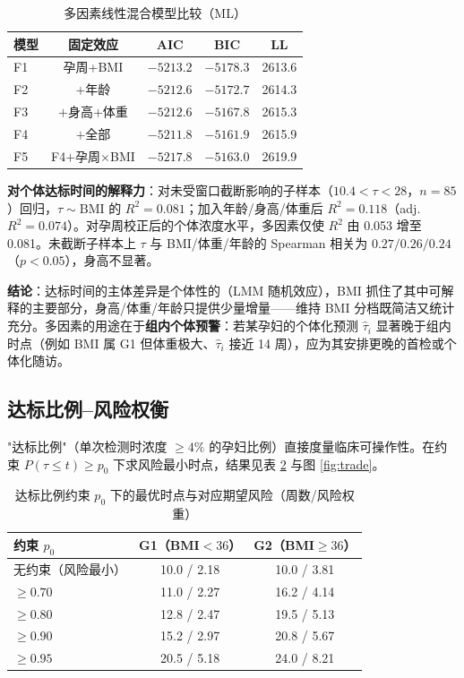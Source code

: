 \documentclass[11pt,a4paper]{ctexart}
\begin{document}
\begin{table}[H]
\centering\small
\caption{多因素线性混合模型比较（ML）}\label{tab:multi}
\begin{tabular}{lcccc}
\toprule
模型 & 固定效应 & AIC & BIC & LL\\
\midrule
F1 & 孕周+BMI & $\mathbf{-5213.2}$ & $\mathbf{-5178.3}$ & 2613.6\\
F2 & $+$年龄 & $-5212.6$ & $-5172.7$ & 2614.3\\
F3 & $+$身高$+$体重 & $-5212.6$ & $-5167.8$ & 2615.3\\
F4 & $+$全部 & $-5211.8$ & $-5161.9$ & 2615.9\\
F5 & F4$+$孕周$\times$BMI & $-5217.8$ & $-5163.0$ & 2619.9\\
\bottomrule
\end{tabular}
\end{table}

\textbf{对个体达标时间的解释力}：对未受窗口截断影响的子样本（$10.4<\tau<28$，$n=85$）回归，$\tau\sim\mathrm{BMI}$ 的 $R^2=0.081$；加入年龄/身高/体重后 $R^2=0.118$（adj.\ $R^2=0.074$）。对孕周校正后的个体浓度水平，多因素仅使 $R^2$ 由 0.053 增至 0.081。未截断子样本上 $\tau$ 与 BMI/体重/年龄的 Spearman 相关为 $0.27/0.26/0.24$（$p<0.05$），身高不显著。

\textbf{结论}：达标时间的主体差异是个体性的（LMM 随机效应），BMI 抓住了其中可解释的主要部分，身高/体重/年龄只提供少量增量——维持 BMI 分档既简洁又统计充分。多因素的用途在于\textbf{组内个体预警}：若某孕妇的个体化预测 $\hat\tau_i$ 显著晚于组内时点（例如 BMI 属 G1 但体重极大、$\hat\tau_i$ 接近 14 周），应为其安排更晚的首检或个体化随访。

\subsection{达标比例--风险权衡}
"达标比例"（单次检测时浓度 $\ge4\%$ 的孕妇比例）直接度量临床可操作性。在约束 $P(\tau\le t)\ge p_0$ 下求风险最小时点，结果见表 \ref{tab:trade} 与图 \ref{fig:trade}。

\begin{table}[H]
\centering\small
\caption{达标比例约束 $p_0$ 下的最优时点与对应期望风险（周数/风险权重）}\label{tab:trade}
\begin{tabular}{lcc}
\toprule
约束 $p_0$ & G1（BMI$<36$） & G2（BMI$\ge36$）\\
\midrule
无约束（风险最小） & 10.0 / 2.18 & 10.0 / 3.81\\
$\ge0.70$ & 11.0 / 2.27 & 16.2 / 4.14\\
$\ge0.80$ & 12.8 / 2.47 & 19.5 / 5.13\\
$\ge0.90$ & 15.2 / 2.97 & 20.8 / 5.67\\
$\ge0.95$ & 20.5 / 5.18 & 24.0 / 8.21\\
\bottomrule
\end{tabular}
\end{table}
\end{document}
